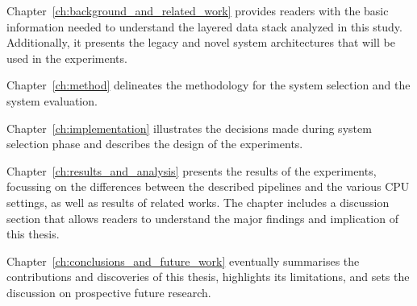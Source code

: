 Chapter~\ref{ch:background_and_related_work} provides readers with the basic information needed to understand the layered data stack analyzed in this study. Additionally, it presents the legacy and novel system architectures that will be used in the experiments.

Chapter~\ref{ch:method} delineates the methodology for the system selection and the system evaluation. 

Chapter~\ref{ch:implementation} illustrates the decisions made during system selection phase and describes the design of the experiments.

Chapter~\ref{ch:results_and_analysis} presents the results of the experiments, focussing on the differences between the described pipelines and the various \gls{CPU} settings, as well as results of related works. The chapter includes a discussion section that allows readers to understand the major findings and implication of this thesis.

Chapter~\ref{ch:conclusions_and_future_work} eventually summarises the contributions and discoveries of this thesis, highlights its limitations, and sets the discussion on prospective future research.